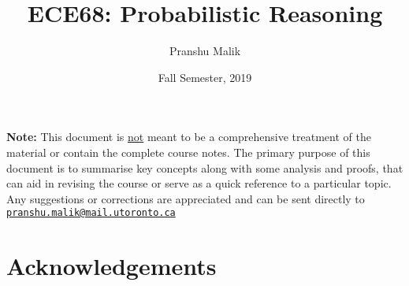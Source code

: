 \documentclass[10pt]{article}
\date{Fall Semester, 2019}
\begin{document}
\title{\textbf{\Large{\textsc{ECE68:} Probabilistic Reasoning}}\vspace{-0.3cm}}
\author{Pranshu Malik}

\maketitle
\tableofcontents
\blfootnote
{
    \textbf{Note:} This document is \underline{not} meant to be a comprehensive treatment of the material 
    or contain the complete course notes. The primary purpose of this document is to summarise key concepts
    along with some analysis and proofs, that can aid in revising the course or serve as a quick reference 
    to a particular topic. Any suggestions or corrections are appreciated and can be
    sent directly to \texttt{\href{mailto:pranshu.malik@mail.utoronto.ca}{pranshu.malik@mail.utoronto.ca}}
}

\section{Acknowledgements}
\end{document}
